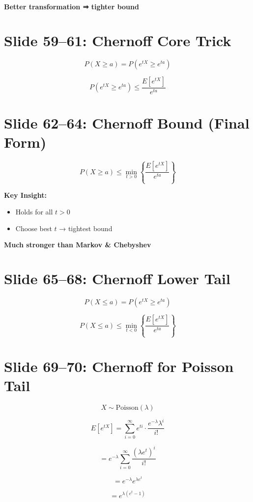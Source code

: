 \documentclass[12pt]{article}
\begin{document}
\textbf{Better transformation ⇒ tighter bound}

\section*{Slide 59–61: Chernoff Core Trick}
\[
P(X \ge a) = P(e^{tX} \ge e^{ta})
\]

\[
P(e^{tX} \ge e^{ta}) \le \frac{E[e^{tX}]}{e^{ta}}
\]

\section*{Slide 62–64: Chernoff Bound (Final Form)}
\[
P(X \ge a) \le \min_{t > 0} \left\{ \frac{E[e^{tX}]}{e^{ta}} \right\}
\]

\textbf{Key Insight:}
\begin{itemize}
\item Holds for all \( t > 0 \)  
\item Choose best \( t \) → tightest bound  
\end{itemize}

\textbf{Much stronger than Markov \& Chebyshev}

\section*{Slide 65–68: Chernoff Lower Tail}
\[
P(X \le a) = P(e^{tX} \ge e^{ta})
\]

\[
P(X \le a) \le \min_{t<0} \left\{ \frac{E[e^{tX}]}{e^{ta}} \right\}
\]

\section*{Slide 69–70: Chernoff for Poisson Tail}
\[
X \sim \text{Poisson}(\lambda)
\]

\[
E[e^{tX}] = \sum_{i=0}^{\infty} e^{ti} \cdot \frac{e^{-\lambda}\lambda^i}{i!}
\]

\[
= e^{-\lambda} \sum_{i=0}^{\infty} \frac{(\lambda e^t)^i}{i!}
\]

\[
= e^{-\lambda} e^{\lambda e^t}
\]

\[
= e^{\lambda(e^t - 1)}
\]
\end{document}
